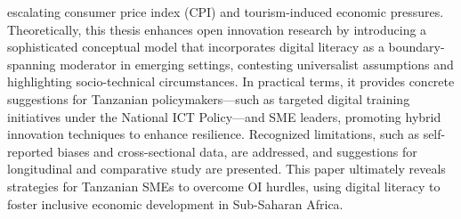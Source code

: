 \documentclass[12pt,a4paper]{report}
\begin{document}
escalating consumer price index (CPI) and tourism-induced economic pressures. Theoretically, this thesis enhances open innovation research by introducing a sophisticated conceptual model that incorporates digital literacy as a boundary-spanning moderator in emerging settings, contesting universalist assumptions and highlighting socio-technical circumstances. In practical terms, it provides concrete suggestions for Tanzanian policymakers---such as targeted digital training initiatives under the National ICT Policy---and SME leaders, promoting hybrid innovation techniques to enhance resilience. Recognized limitations, such as self-reported biases and cross-sectional data, are addressed, and suggestions for longitudinal and comparative study are presented. This paper ultimately reveals strategies for Tanzanian SMEs to overcome OI hurdles, using digital literacy to foster inclusive economic development in Sub-Saharan Africa.

\tableofcontents
\cleardoublepage
{}











\cleardoublepage
\printbibliography
\end{document}
